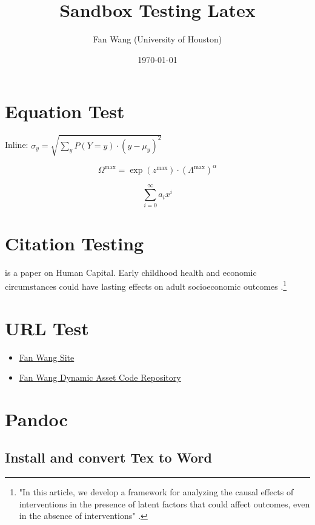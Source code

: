 \documentclass[12pt,english]{article}
\title{Sandbox Testing Latex}
\author{Fan Wang (University of Houston)}
\date{\today}
\begin{document}
\maketitle

\section{Equation Test}

Inline: $\sigma_y = \sqrt{ \sum_{y} P(Y=y) \cdot \left( y - \mu_y \right)^2}$

$$\Omega^{\max} = \exp(z^{\max}) \cdot \left(\Lambda^{\max}\right)^{\alpha}$$

\begin{equation}
\label{eq:1}
\sum_{i=0}^{\infty} a_i x^i
\end{equation}

\section{Citation Testing}

\textcite{becker_human_1986} is a paper on Human Capital. Early childhood health and economic circumstances could have lasting effects on adult socioeconomic outcomes \autocite{case_lasting_2005}.\footnote{"In this article, we develop a framework for analyzing the causal effects of interventions in the presence of latent factors that could affect outcomes, even in the absence of interventions" \autocite{conti_understanding_2010}.}

\section{URL Test}

\begin{itemize}
	\item \href{http://fanwangecon.github.io}{Fan Wang Site}
	\item \href{https://fanwangecon.github.io/CodeDynaAsset/}{Fan Wang Dynamic Asset Code Repository}
\end{itemize}


\pagebreak

\section{Pandoc}

\subsection{Install and convert Tex to Word}
\end{document}

